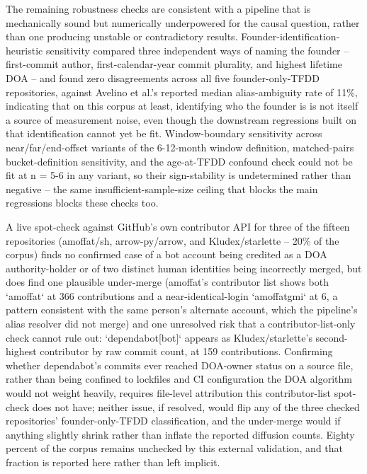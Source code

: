 \documentclass[11pt,letterpaper]{article}
\begin{document}
The remaining robustness checks are consistent with a pipeline that is mechanically sound but numerically underpowered for the causal question, rather than one producing unstable or contradictory results. Founder-identification-heuristic sensitivity compared three independent ways of naming the founder -- first-commit author, first-calendar-year commit plurality, and highest lifetime DOA -- and found zero disagreements across all five founder-only-TFDD repositories, against Avelino et al.'s reported median alias-ambiguity rate of 11\%, indicating that on this corpus at least, identifying who the founder is is not itself a source of measurement noise, even though the downstream regressions built on that identification cannot yet be fit. Window-boundary sensitivity across near/far/end-offset variants of the 6-12-month window definition, matched-pairs bucket-definition sensitivity, and the age-at-TFDD confound check could not be fit at n = 5-6 in any variant, so their sign-stability is undetermined rather than negative -- the same insufficient-sample-size ceiling that blocks the main regressions blocks these checks too.

A live spot-check against GitHub's own contributor API for three of the fifteen repositories (amoffat/sh, arrow-py/arrow, and Kludex/starlette -- 20\% of the corpus) finds no confirmed case of a bot account being credited as a DOA authority-holder or of two distinct human identities being incorrectly merged, but does find one plausible under-merge (amoffat's contributor list shows both `amoffat` at 366 contributions and a near-identical-login `amoffatgmi` at 6, a pattern consistent with the same person's alternate account, which the pipeline's alias resolver did not merge) and one unresolved risk that a contributor-list-only check cannot rule out: `dependabot[bot]` appears as Kludex/starlette's second-highest contributor by raw commit count, at 159 contributions. Confirming whether dependabot's commits ever reached DOA-owner status on a source file, rather than being confined to lockfiles and CI configuration the DOA algorithm would not weight heavily, requires file-level attribution this contributor-list spot-check does not have; neither issue, if resolved, would flip any of the three checked repositories' founder-only-TFDD classification, and the under-merge would if anything slightly shrink rather than inflate the reported diffusion counts. Eighty percent of the corpus remains unchecked by this external validation, and that fraction is reported here rather than left implicit.
\end{document}
